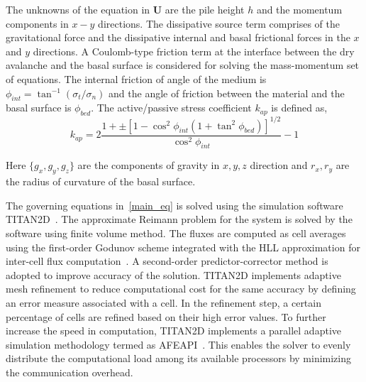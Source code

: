 \noindent The unknowns of the equation in $\textbf{U}$ are the pile height $h$ and the momentum components in $x-y$ directions. The dissipative source term comprises of the gravitational force and the dissipative internal and basal frictional forces in the $x$ and $y$ directions. A Coulomb-type friction term at the interface between the dry avalanche and the basal surface is considered for solving the mass-momentum set of equations. The internal friction of angle of the medium is $\phi_{int} = \tan^{-1} (\sigma_t /\sigma_n)$ and the angle of friction between the material and the basal surface is $\phi_{bed}$. The active/passive stress coefficient $k_{ap}$ is defined as,
\begin{equation}
k_{ap} = 2 \frac{1 +\pm \left[ 1 - \cos^2\phi_{int} \left( 1+ \tan^2\phi_{bed} \right) \right]^{1/2}}{\cos^2 \phi_{int}} - 1
\end{equation}

\noindent Here $\lbrace g_x, g_y, g_z \rbrace$ are the components of gravity in $x,y,z$ direction and $r_x, r_y$ are the radius of curvature of the basal surface. 

The governing equations in~\ref{main_eq} is solved using the simulation software TITAN2D~\cite{patra2005parallel,SHERIDAN200589}. The approximate Reimann problem for the system is solved by the software using finite volume method. The fluxes are computed as cell averages using the first-order Godunov scheme integrated with the HLL approximation for inter-cell flux computation~\cite{harten1983upstream}. A  second-order predictor-corrector method is adopted to improve accuracy of the solution. TITAN2D implements adaptive mesh refinement to reduce computational cost for the same accuracy by defining an error measure associated with a cell. In the refinement step, a certain percentage of cells are refined based on their high error values. To further increase the speed in computation, TITAN2D implements a parallel adaptive simulation methodology termed as AFEAPI~\cite{laszloffy2000simple,patra2003data}. This enables the solver to evenly distribute the computational load among its available processors by minimizing the communication overhead.

